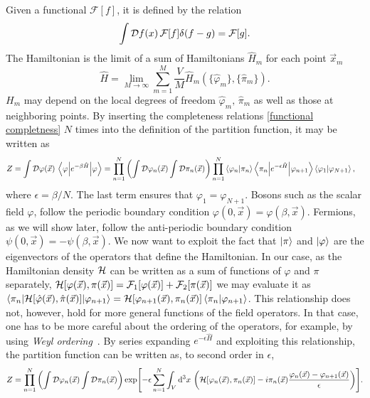 Given a functional $\mathcal{F}[f]$, it is defined by the relation
\begin{equation}
    \int \mathcal{D} f(x)\, \mathcal{F}[f] \delta(f - g) = \mathcal{F}[g].
\end{equation}
The Hamiltonian is the limit of a sum of Hamiltonians $\hat H_m$ for each point $\vec x_m$
\begin{equation*}
    \hat H
    = \lim_{M \rightarrow \infty} \sum_{m=1}^M 
    \frac{V}{M} \hat H_m(\{\hat \varphi_m\}, \{\hat \pi_m\}).
\end{equation*}
$H_m$ may depend on the local degrees of freedom $\hat \varphi_m, \, \hat \pi_m$ as well as those at neighboring points.
By inserting the completeness relations \autoref{functional completness} $N$ times into the definition of the partition function, it may be written as
\begin{align*}
    Z& 
    = \int \mathcal{D}\varphi(\vec x) \, \left\langle \varphi {\left| e^{- \beta \hat H} \right|} \varphi \right\rangle
    = 
    \prod_{n=1}^N
    \left(
        \int \mathcal{D} \varphi_n (\vec x) \int \mathcal{D} \pi_n(\vec x)
    \right) 
    \prod_{n=1}^N  \braket{\varphi_n}{\pi_n}
    \left\langle \pi_n {\left| e^{- \epsilon \hat H} \right|} \varphi_{n+1} \right\rangle \braket{\varphi_{1}}{\varphi_{N+1}},
\end{align*}
where $\epsilon = \beta / N$. The last term ensures that $\varphi_1 = \varphi_{N+1}$.
Bosons such as the scalar field $\varphi$, follow the periodic boundary condition $\varphi(0, \vec x) = \varphi(\beta, \vec x)$.
Fermions, as we will show later, follow the anti-periodic boundary condition $\psi(0, \vec x) = -\psi(\beta, \vec x)$.
We now want to exploit the fact that $\ket{\pi}$ and $\ket{\varphi}$ are the eigenvectors of the operators that define the Hamiltonian.
In our case, as the Hamiltonian density $\mathcal{H}$ can be written as a sum of functions of $\varphi$ and $\pi$ separately, $\mathcal{H}[\varphi(\vec x), \pi(\vec x)] = \mathcal{F}_1[\varphi(\vec x)] + \mathcal{F}_2[\pi(\vec x)]$ we may evaluate it as $\left\langle \pi_n {\left| \mathcal{H}[\hat \varphi(\vec x), \hat \pi(\vec x)] \right|} \varphi_{n+1} \right\rangle = \mathcal{H}[\varphi_{n+1}(\vec x), \pi_n(\vec x)] \braket{\pi_n}{\varphi_{n+1}}$.
This relationship does not, however, hold for more general functions of the field operators.
In that case, one has to be more careful about the ordering of the operators, for example, by using \emph{Weyl ordering}~\cite{Peskin:IntroQFT}.
By series expanding $e^{-\epsilon \hat H}$ and exploiting this relationship, the partition function can be written as, to second order in $\epsilon$,
\begin{align*}
    Z = 
    \prod_{n=1}^N  
    \left(
        \int \mathcal{D} \varphi_n (\vec x) \int \mathcal{D} \pi_n(\vec x)
    \right)
    \exp[-\epsilon \sum_{n=1}^N \int_V \dd^3x \,
    \left(
        \mathcal{H}[\varphi_n(\vec x), \pi_n(\vec x)] - i \pi_n(\vec x) \frac{\varphi_n(\vec x) - \varphi_{n+1}(\vec x)}{\epsilon}
    \right)
    ].
\end{align*}
